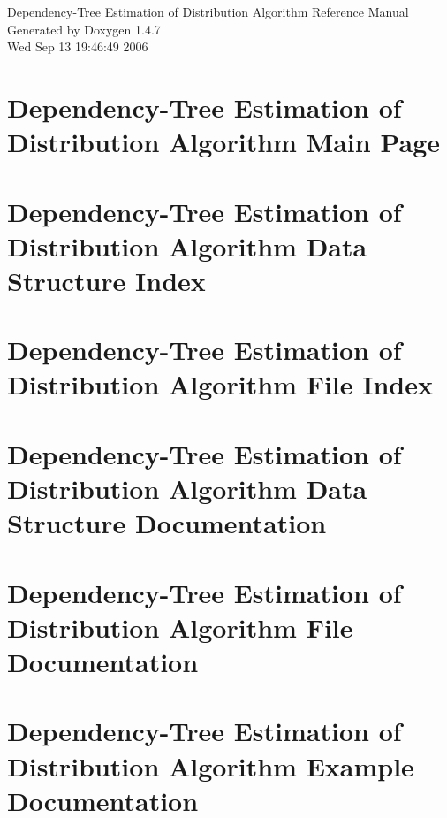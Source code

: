 \documentclass[a4paper]{book}
\begin{document}
\begin{titlepage}
\vspace*{7cm}
\begin{center}
{\Large Dependency-Tree Estimation of Distribution Algorithm Reference Manual}\\
\vspace*{1cm}
{\large Generated by Doxygen 1.4.7}\\
\vspace*{0.5cm}
{\small Wed Sep 13 19:46:49 2006}\\
\end{center}
\end{titlepage}
\clearemptydoublepage
{}
\tableofcontents
\clearemptydoublepage
{}
\chapter{Dependency-Tree Estimation of Distribution Algorithm Main Page}
\label{index}\hypertarget{index}{}
\chapter{Dependency-Tree Estimation of Distribution Algorithm Data Structure Index}

\chapter{Dependency-Tree Estimation of Distribution Algorithm File Index}

\chapter{Dependency-Tree Estimation of Distribution Algorithm Data Structure Documentation}





\chapter{Dependency-Tree Estimation of Distribution Algorithm File Documentation}





















\chapter{Dependency-Tree Estimation of Distribution Algorithm Example Documentation}





\printindex
\end{document}
